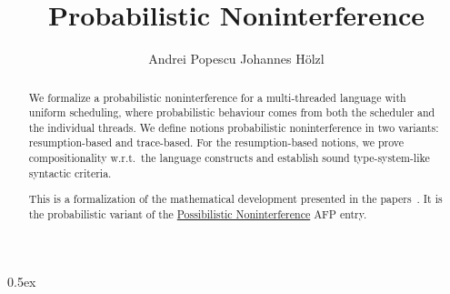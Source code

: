 \documentclass[11pt,a4paper]{article}
\begin{document}
\title{Probabilistic Noninterference}

\author{Andrei Popescu \hspace*{10ex} Johannes H\"{o}lzl}

\maketitle

\begin{abstract}

We formalize a probabilistic noninterference for a multi-threaded language with
uniform scheduling, where probabilistic behaviour comes from both the scheduler
and the individual threads. We define notions probabilistic noninterference 
in two variants: resumption-based and trace-based. For the resumption-based notions, 
we prove compositionality w.r.t.\ the language constructs and establish sound
type-system-like syntactic criteria.  

This is a formalization of the mathematical development presented in the
papers~\cite{cpp2013,calco2013}. It is the probabilistic variant of the 
\href{http://afp.sourceforge.net/entries/Possibilistic_Noninterference.shtml}{Possibilistic Noninterference}
AFP entry.

\end{abstract}


\tableofcontents

\parindent 0pt\parskip 0.5ex





\end{document}
